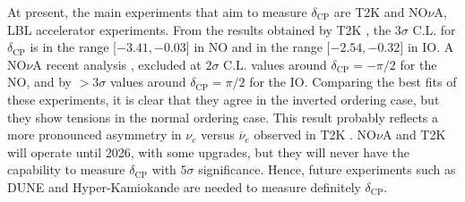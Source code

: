 At present, the main experiments that aim to measure $\delta_{\text{CP}}$ are T2K and NO$\nu$A, LBL accelerator experiments. From the results obtained by T2K \cite{T2K-constr}, the $3\sigma$ C.L. for $\delta_{\text{CP}}$ is in the range [$-3.41, -0.03$] in NO and in the range [$-2.54, -0.32$] in IO. A NO$\nu$A recent analysis \cite{NOvA-CPviol}, excluded at $2\sigma$ C.L. values around $\delta_{\text{CP}} = -\pi/2$ for the NO, and by $> 3\sigma$ values around $\delta_{\text{CP}} = \pi/2$ for the IO. Comparing the best fits of these experiments, it is clear that they agree in the inverted ordering case, but they show tensions in the normal ordering case. This result probably reflects a more pronounced asymmetry in $\nu_e$ versus $\overline{\nu}_e$ observed in T2K \cite{NOvA-CPviol}.  NO$\nu$A and T2K will operate until 2026, with some upgrades, but they will never have the capability to measure $\delta_{\text{CP}}$ with $5\sigma$ significance. 
Hence, future experiments such as DUNE and Hyper-Kamiokande are needed to measure definitely $\delta_{\text{CP}}$.